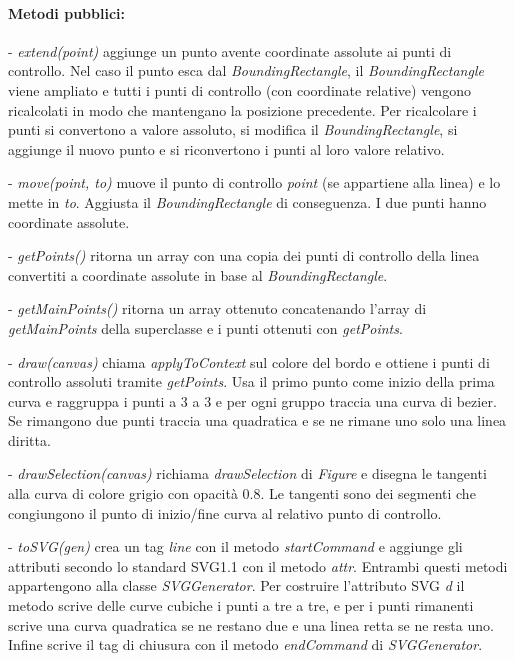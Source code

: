 \paragraph{Metodi pubblici:}
\begin{elencopuntato}[\subsubsecindent]
\item[-] \textit{extend(point)} aggiunge un punto avente coordinate assolute ai punti di controllo. Nel caso il punto esca dal \textit{BoundingRectangle}, il \textit{BoundingRectangle} viene ampliato e tutti i punti di controllo (con coordinate relative) vengono ricalcolati in modo che mantengano la posizione precedente. Per ricalcolare i punti si convertono a valore assoluto, si modifica il \textit{BoundingRectangle}, si aggiunge il nuovo punto e si riconvertono i 
punti al loro valore relativo.
\item[-] \textit{move(point, to)} muove il punto di controllo \textit{point} (se appartiene alla linea) e lo mette in \textit{to}. Aggiusta il \textit{BoundingRectangle} di conseguenza. I due punti hanno coordinate assolute.
\item[-] \textit{getPoints()} ritorna un array con una copia dei punti di controllo della linea convertiti a coordinate assolute in base al \textit{BoundingRectangle}.
\item[-] \textit{getMainPoints()} ritorna un array ottenuto concatenando l'array di \textit{getMainPoints} della superclasse e i punti ottenuti con \textit{getPoints}.
\item[-] \textit{draw(canvas)} chiama \textit{applyToContext} sul colore del bordo e ottiene i punti di controllo assoluti tramite \textit{getPoints}. Usa il primo punto come inizio della prima curva e raggruppa i punti a 3 a 3 e per ogni gruppo traccia una curva di bezier. Se rimangono due punti traccia una quadratica e se ne rimane uno solo una linea diritta.
\item[-] \textit{drawSelection(canvas)} richiama \textit{drawSelection} di \textit{Figure} e disegna le tangenti alla curva di colore grigio con opacit\`a 0.8. Le tangenti sono dei segmenti che congiungono il punto di inizio/fine curva al relativo punto di controllo.
\item[-] \textit{toSVG(gen)} crea un tag \textit{line} con il metodo \textit{startCommand} e aggiunge gli attributi secondo lo standard SVG1.1 con il metodo \textit{attr}. Entrambi questi metodi appartengono alla classe \textit{SVGGenerator}. Per costruire l'attributo SVG \textit{d} il metodo scrive delle curve cubiche i punti a tre a tre, e per i punti rimanenti scrive una curva quadratica se ne restano due e una linea retta se ne resta uno. Infine scrive il tag di chiusura con il metodo \textit{endCommand} di \textit{SVGGenerator}.
\end{elencopuntato}

